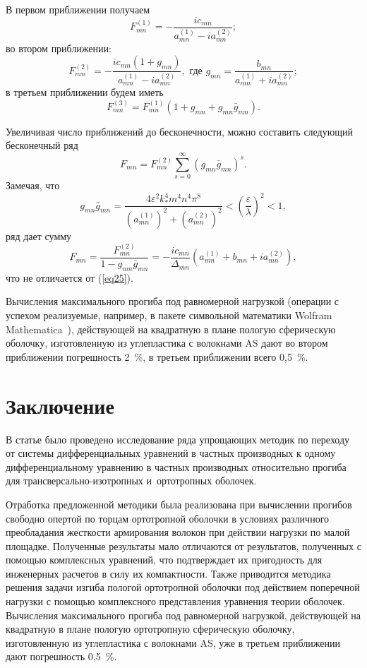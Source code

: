 \documentclass[press]{vestnik}
\begin{document}
В первом приближении получаем
\[
F_{mn}^{(1)} =-\frac{ic_{mn} }{a_{mn}^{(1)} -ia_{mn}^{(2)} };
\]
во втором приближении:
\[
F_{mn}^{(2)} =-\frac{ic_{mn} \left( {1+g_{mn} } \right)}{a_{mn}^{(1)} 
-ia_{mn}^{(2)} }, \text{ где } g_{mn} =\frac{b_{mn} }{a_{mn}^{(1)} +ia_{mn}^{(2)} };
\]
в третьем приближении будем иметь
\[
F_{mn}^{(3)} =F_{mn}^{(1)} \left( {1+g_{mn} +g_{mn} \bar{{g}}_{mn} } 
\right).
\]

Увеличивая число приближений до бесконечности, можно составить следующий 
бесконечный ряд
\[
F_{mn} =F_{mn}^{(2)} \sum\limits_{s=0}^\infty {\left( {g_{mn} \bar{{g}}_{mn} 
} \right)^{s}} .
\]
Замечая, что
\[
g_{mn} \bar{{g}}_{mn} =\frac{4\varepsilon^{2}k_{\ast }^{4} m^{4}n^{4}\pi 
^{8}}{\left( {a_{mn}^{(1)} } \right)^{2}+\left( {a_{mn}^{(2)} } 
\right)^{2}}<\left( {\frac{\varepsilon }{\lambda }} \right)^{2}<1,
\]
ряд дает сумму
\[
F_{mn} =\frac{F_{mn}^{(2)} }{1-g_{mn} \bar{{g}}_{mn} }=-\frac{ic_{mn} 
}{\Delta_{mn} }\left( {a_{mn}^{(1)} +b_{mn} +ia_{mn}^{(2)} } \right),
\]
что не отличается от (\ref{eq25}).

Вычисления максимального прогиба под равномерной нагрузкой (операции с 
успехом реализуемые, например, в пакете символьной математики 
Wolfram Mathematica~\cite{B16,B17}), действующей на квадратную в плане пологую 
сферическую оболочку, изготовленную из углепластика с волокнами AS дают во 
втором приближении погрешность 2~{\%}, в третьем приближении всего 0,5~{\%}.

\section*{Заключение}

В статье было проведено исследование ряда упрощающих методик по переходу от 
системы дифференциальных уравнений в частных производных к одному 
дифференциальному уравнению в частных производных относительно прогиба для 
трансверсально-изотропных и~ортотропных оболочек.

Отработка предложенной методики была реализована при вычислении прогибов 
свободно опертой по торцам ортотропной оболочки в условиях различного 
преобладания жесткости армирования волокон при действии нагрузки по малой 
площадке. Полученные результаты мало отличаются от результатов, полученных с 
помощью комплексных уравнений, что подтверждает их пригодность для 
инженерных расчетов в силу их компактности. Также приводится методика 
решения задачи изгиба пологой ортотропной оболочки под действием поперечной 
нагрузки с помощью комплексного представления уравнения теории оболочек. 
Вычисления максимального прогиба под равномерной нагрузкой, действующей на 
квадратную в плане пологую ортотропную сферическую оболочку, изготовленную 
из углепластика с волокнами AS, уже в третьем приближении дают погрешность 
0,5~{\%}.
\end{document}
